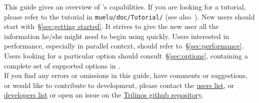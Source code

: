 This guide gives an overview of \muelu{}'s capabilities.  If you are looking for
a tutorial, please refer to the \muelu{} tutorial in \verb!muelu/doc/Tutorial/!
(see also~\cite{MueLuTutorial}). New users should start with~\S\ref{sec:getting
started}. It strives to give the new user all the information he/she might need
to begin using \muelu{} quickly. Users interested in performance, especially in
parallel context, should refer to~\S\ref{sec:performance}.  Users looking for a
particular option should consult~\S\ref{sec:options}, containing a complete set of
supported options in \muelu{}. \\

\noindent
If you find any errors or omissions in this guide, have comments or suggestions,
or would like to contribute to \muelu{} development, please contact the \muelu{}
\href{mailto:muelu-users@software.sandia.gov}{users list}, or
\href{mailto:muelu-developers@software.sandia.gov}{developers list} or open an
issue on the \href{https://github.com/trilinos/Trilinos}{Trilinos github repository}.


